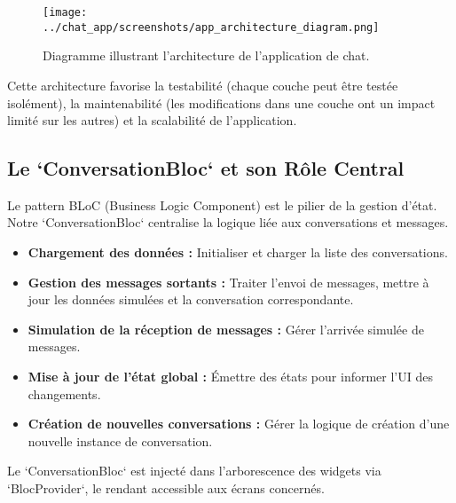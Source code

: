\documentclass[12pt,a4paper]{article}
\begin{document}
\begin{figure}[htbp]
    \centering
    \texttt{[image: ../chat\_app/screenshots/app\_architecture\_diagram.png]}
    \caption{Diagramme illustrant l'architecture de l'application de chat.}
    \label{fig:app_architecture_diagram}
\end{figure}

Cette architecture favorise la testabilité (chaque couche peut être testée isolément), la maintenabilité (les modifications dans une couche ont un impact limité sur les autres) et la scalabilité de l'application.

\subsection{Le `ConversationBloc` et son Rôle Central}
Le pattern BLoC (Business Logic Component) est le pilier de la gestion d'état. Notre `ConversationBloc` centralise la logique liée aux conversations et messages.

\begin{infobox}[title=Responsabilités du ConversationBloc]
\begin{itemize}
    \item \textbf{Chargement des données :} Initialiser et charger la liste des conversations.
    \item \textbf{Gestion des messages sortants :} Traiter l'envoi de messages, mettre à jour les données simulées et la conversation correspondante.
    \item \textbf{Simulation de la réception de messages :} Gérer l'arrivée simulée de messages.
    \item \textbf{Mise à jour de l'état global :} Émettre des états pour informer l'UI des changements.
    \item \textbf{Création de nouvelles conversations :} Gérer la logique de création d'une nouvelle instance de conversation.
\end{itemize}
\end{infobox}

Le `ConversationBloc` est injecté dans l'arborescence des widgets via `BlocProvider`, le rendant accessible aux écrans concernés.


\end{document}
